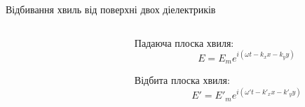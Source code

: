 \documentclass[onlytextwidth]{beamer}
\begin{document}
\begin{frame}[t]{Відбивання хвиль від поверхні двох діелектриків}
\begin{columns}
\begin{column}{0.5\linewidth}
\begin{center}

			\end{center}
		\end{column}
		\begin{column}{0.5\linewidth}
			\only<1-4>
			{
				\begin{block}{}
					Падаюча плоска хвиля:
					\begin{equation*}
						E = E_m e^{i(\omega t - k_xx - k_yy)}
					\end{equation*}

					Відбита плоска хвиля:
					\begin{equation*}
						E' = E'_m e^{i(\omega' t - k'_xx-k'_yy)}
					\end{equation*}


\end{block}}
\end{column}
\end{columns}
\end{frame}
\end{document}
